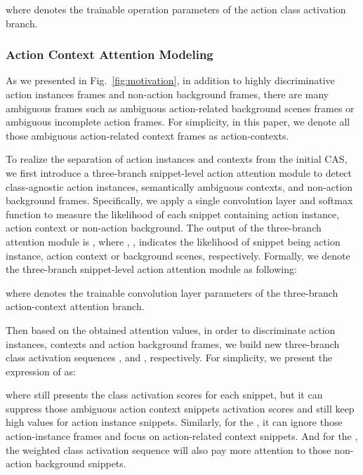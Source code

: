 \documentclass[journal,comsoc]{IEEEtran}
\begin{document}
where  denotes the trainable operation parameters of the action class activation branch.

\subsubsection{Action Context Attention Modeling}
\label{sec:action_context_modeling}
\par As we presented in Fig.~\ref{fig:motivation}, in addition to highly discriminative action instances frames and non-action background frames, there are many ambiguous frames such as ambiguous action-related background scenes frames or ambiguous incomplete action frames. For simplicity, in this paper, we denote all those ambiguous action-related context frames as action-contexts. 
\par To realize the separation of action instances and contexts from the initial CAS, we first introduce a three-branch snippet-level action attention module to detect class-agnostic action instances, semantically ambiguous contexts, and non-action background frames. Specifically, we apply a single convolution layer and softmax function to measure the likelihood of each snippet containing action instance, action context or non-action background. The output of the three-branch attention module is , where , ,  indicates the likelihood of snippet  being action instance, action context or background scenes, respectively. Formally, we denote the three-branch snippet-level action attention module as following:

where  denotes the trainable convolution layer parameters of the three-branch action-context attention branch.
\par Then based on the obtained attention values, in order to discriminate action instances, contexts and action background frames, we build new three-branch class activation sequences ,  and , respectively. For simplicity, we present the expression of  as:

where  still presents the class activation scores for each snippet, but it can suppress those ambiguous action context snippets activation scores and still keep high values for action instance snippets. Similarly, for the , it can ignore those action-instance frames and focus on action-related context snippets. And for the , the weighted class activation sequence will also pay more attention to those non-action background snippets.
\end{document}
